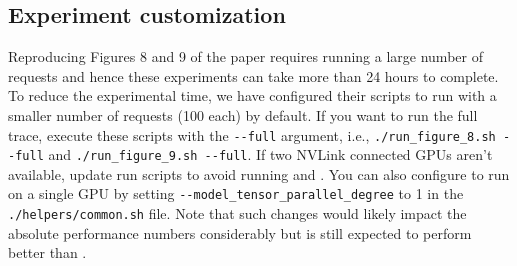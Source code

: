 \subsection{Experiment customization}
Reproducing Figures 8 and 9 of the paper requires running a large number of requests and hence these experiments can take more than 24 hours to complete. To reduce the experimental time, we have configured their scripts to run with a smaller number of requests (100 each) by default. If you want to run the full trace, execute these scripts with the \verb|--full| argument, i.e., \verb|./run_figure_8.sh --full| and \verb|./run_figure_9.sh --full|. If two NVLink connected GPUs aren't available, update run scripts to avoid running \llamasmall and \yimedium. You can also configure \llamasmall to run on a single GPU by setting \verb|--model_tensor_parallel_degree| to 1 in the \verb|./helpers/common.sh| file. Note that such changes would likely impact the absolute performance numbers considerably but \sysname is still expected to perform better than \pa.


